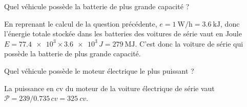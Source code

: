 


\begin{enonce}
Quel véhicule possède la batterie de plus grande capacité ?
\end{enonce}


\begin{corrige}
En reprenant le calcul de la question précédente, $e=\SI{1}{ \watt / \hour}=\SI{3,6}{\kJ}$, donc l'énergie totale stockée dans les batteries des voitures de série vaut en Joule 
$E=\num{77,4 e3}\times \num{3,6 e3}\, \si{J}=\SI{279}{\mega \joule}$. C'est donc la voiture de série qui possède la batterie de plus grande capacité.
\end{corrige}




\begin{enonce}
Quel véhicule possède le moteur électrique le plus puissant ?
\end{enonce}


\begin{corrige}
La puissance en \si{cv} du moteur de la voiture électrique de série vaut $\mathcal{P}=\num{239} /\num{0,735} \, \si{cv}=\SI{325}{cv}$.
\end{corrige}


\finEntrainement



\newpage




